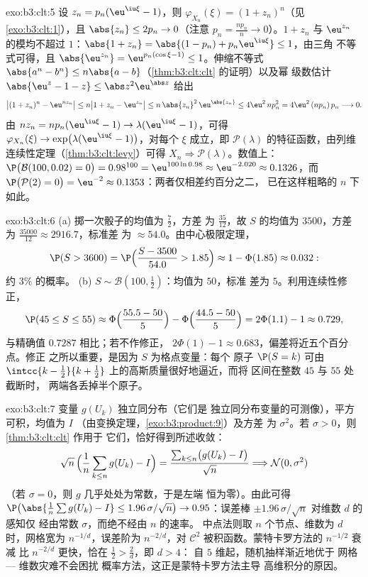 \begin{solution}{exo:b3:clt:5}
设 $z_n = p_n(\eu^{\iu\xi} - 1)$，则 $\varphi_{X_n}(\xi) =
(1 + z_n)^n$（见\cref{exo:b3:clt:1}），且 $\abs{z_n} \leq 2p_n
\to 0$（注意 $p_n = \frac{np_n}n \to 0$）。$1 + z_n$ 与
$\eu^{z_n}$ 的模均不超过 $1$：$\abs{1 + z_n} =
\abs{(1 - p_n) + p_n\eu^{\iu\xi}} \leq 1$，由三角
不等式可得，且 $\abs{\eu^{z_n}} = \eu^{p_n(\cos\xi - 1)}
\leq 1$。伸缩不等式 $\abs{a^n - b^n} \leq
n\abs{a - b}$（\cref{thm:b3:clt:clt} 的证明）以及幂
级数估计 $\abs{\eu^z - 1 - z} \leq
\abs z^2\eu^{\abs z}$ 给出
\[
\bigl|(1 + z_n)^n - \eu^{nz_n}\bigr| \leq n\bigl|1 + z_n -
\eu^{z_n}\bigr| \leq n\,\abs{z_n}^2\,\eu^{\abs{z_n}} \leq
4\eu^2\,np_n^2 = 4\eu^2\,(np_n)\,p_n \longrightarrow 0 .
\]
由 $nz_n = np_n(\eu^{\iu\xi} - 1) \to
\lambda(\eu^{\iu\xi} - 1)$，可得 $\varphi_{X_n}(\xi)
\to \exp\bigl(\lambda(\eu^{\iu\xi} - 1)\bigr)$，对每个
$\xi$ 成立，即 $\mathcal P(\lambda)$ 的特征函数，由列维
连续性定理（\cref{thm:b3:clt:levy}）可得 $X_n \Rightarrow \mathcal
P(\lambda)$。数值上：$\P\bigl(\mathcal B(100, 0.02) =
0\bigr) = 0.98^{100} = \eu^{100\ln 0.98} \approx
\eu^{-2.020} \approx 0.1326$，而 $\P\bigl(\mathcal P(2) =
0\bigr) = \eu^{-2} \approx 0.1353$：两者仅相差约百分之二，
已在这样粗略的 $n$ 下如此。
\end{solution}

\begin{solution}{exo:b3:clt:6}
(a) 掷一次骰子的均值为 $\frac72$，方差
为 $\frac{35}{12}$，故 $S$ 的均值为 $3500$，方差
为 $\frac{35000}{12} \approx 2916.7$，标准差
为 $\approx 54.0$。由中心极限定理，
\[
\P(S > 3600) = \P\Bigl(\frac{S - 3500}{54.0} > 1.85\Bigr)
\approx 1 - \Phi(1.85) \approx 0.032 :
\]
约 $3\%$ 的概率。
(b) $S \sim \mathcal B(100, \frac12)$：均值为 $50$，标准
差为 $5$。利用连续性修正，
\[
\P(45 \leq S \leq 55) \approx
\Phi\Bigl(\frac{55.5 - 50}{5}\Bigr) -
\Phi\Bigl(\frac{44.5 - 50}{5}\Bigr) = 2\Phi(1.1) - 1
\approx 0.729,
\]
与精确值 $0.7287$ 相比；若不作修正，
$2\Phi(1) - 1 \approx 0.683$，偏差将近五个百分点。修正
之所以重要，是因为 $S$ 为格点变量：每个
原子 $\P(S = k)$ 可由
$\intcc{k - \frac12}{k + \frac12}$ 上的高斯质量很好地逼近，而将
区间在整数 $45$ 与 $55$ 处截断时，
两端各丢掉半个原子。
\end{solution}

\begin{solution}{exo:b3:clt:7}
变量 $g(U_k)$ 独立同分布（它们是
独立同分布变量的可测像），平方可积，均值为 $I$
（由变换定理，\cref{exo:b3:product:9}）及方差
为 $\sigma^2$。若 $\sigma > 0$，则 \cref{thm:b3:clt:clt} 作用于
它们，恰好得到所述收敛：
\[
\sqrt n\,\Bigl(\frac1n\sum_{k\leq n}g(U_k) - I\Bigr) =
\frac{\sum_{k\leq n}\bigl(g(U_k) - I\bigr)}{\sqrt n}
\Longrightarrow \mathcal N(0, \sigma^2)
\]
（若 $\sigma = 0$，则 $g$ 几乎处处为常数，于是左端
恒为零）。由此可得
$\P\bigl(\abs{\frac1n\sum g(U_k) - I} \leq
1.96\,\sigma/\sqrt n\bigr) \to 0.95$：误差棒 $\pm
1.96\,\sigma/\sqrt n$ 对维数 $d$ 的感知仅
经由常数 $\sigma$，而绝不经由 $n$ 的速率。
中点法则取 $n$ 个节点、维数为 $d$ 时，网格宽为
$n^{-1/d}$，误差阶为 $n^{-2/d}$，对 $\mathcal C^2$
被积函数。蒙特卡罗方法的 $n^{-1/2}$ 衰减
比 $n^{-2/d}$ 更快，恰在 $\frac12 > \frac2d$，即 $d > 4$：
自 $5$ 维起，随机抽样渐近地优于
网格 --- 维数灾难不会困扰
概率方法，这正是蒙特卡罗方法主导
高维积分的原因。
\end{solution}

